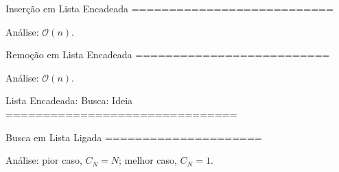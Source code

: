 Inserção em Lista Encadeada
===========================



Análise: $\mathcal{O}(n)$.


Remoção em Lista Encadeada
==========================



Análise: $\mathcal{O}(n)$.


Lista Encadeada: Busca: Ideia
===============================
  


Busca em Lista Ligada
=====================



Análise: pior caso, $C_N = N$; melhor caso, $C_N = 1$.
